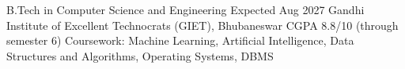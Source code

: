 
\resumeentry
{B.Tech in Computer Science and Engineering}
{Expected Aug 2027}
{Gandhi Institute of Excellent Technocrats (GIET), Bhubaneswar}
{CGPA 8.8/10 (through semester 6)}
\vspace{1pt}
Coursework: Machine Learning, Artificial Intelligence, Data Structures and Algorithms, Operating Systems, DBMS

